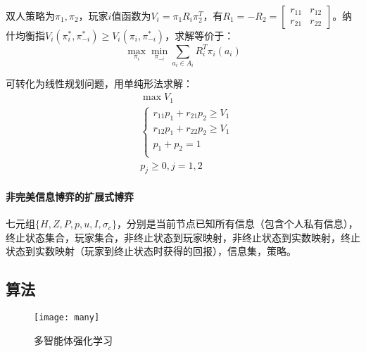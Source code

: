\documentclass[
12pt, %
a4paper, 
oneside, %
headinclude,footinclude, %
]{scrartcl}
\begin{document}
双人策略为$ \pi_1, \pi_2 $，玩家$ i $值函数为$ V_i = \pi_1 R_i \pi_2^T $，有$ R_1 = -R_2 = \begin{bmatrix} r_{11} & r_{12} \\ r_{21} & r_{22} \end{bmatrix} $。纳什均衡指$ V_i(\pi_i^*, \pi_{-i}^*) \geq V_i(\pi_i, \pi_{-i}^*) $，求解等价于：
$$ \max_{\pi_i} \min_{\pi_{-i}} \sum_{a_i \in A_i} R_i^T \pi_i(a_i) $$

可转化为线性规划问题，用单纯形法求解：
\begin{align*}
&\max V_1 \\
&\begin{cases}
r_{11} p_1 + r_{21} p_2 \geq V_1 \\
r_{12} p_1 + r_{22} p_2 \geq V_1 \\
p_1 + p_2 = 1 \\
\end{cases} \\
&p_j \geq 0, j = 1, 2
\end{align*}
\paragraph{非完美信息博弈的扩展式博弈}
七元组$ \{H, Z, P, p, u, I ,\sigma_c\} $，分别是当前节点已知所有信息（包含个人私有信息），终止状态集合，玩家集合，非终止状态到玩家映射，非终止状态到实数映射，终止状态到实数映射（玩家到终止状态时获得的回报），信息集，策略。
\subsection[算法]{算法}
\begin{figure}[H]
\centering
\texttt{[image: many]}
\caption{多智能体强化学习}
\end{figure}
\end{document}
